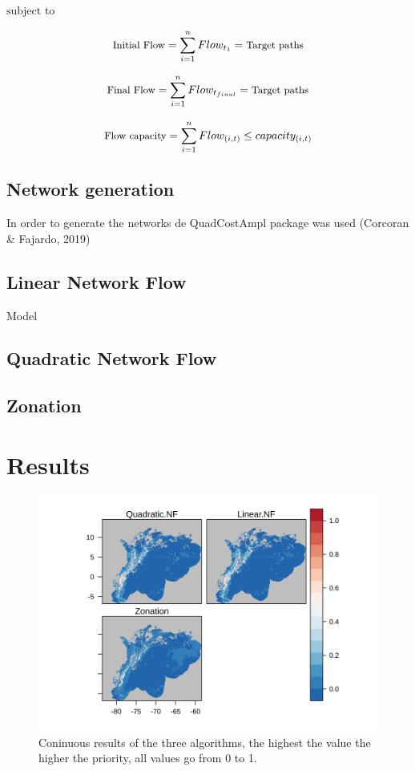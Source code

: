 \documentclass[]{article}
\begin{document}
\(\text{subject to}\)

\[\small \text{Initial Flow} = \sum_{i=1}^n{Flow_{t_1}} = \text{Target paths}\]

\[\small \text{Final Flow} = \sum_{i=1}^n{Flow_{t_{final}}} = \text{Target paths}\]

\[\small \text{Flow capacity} = \sum_{i=1}^n{Flow_{(i,t)}} \leq capacity_{(i,t)}\]

\hypertarget{network-generation}{%
\subsection{Network generation}\label{network-generation}}

In order to generate the networks de QuadCostAmpl package was used (Corcoran \& Fajardo, 2019)

\hypertarget{linear-network-flow}{%
\subsection{Linear Network Flow}\label{linear-network-flow}}

Model

\hypertarget{quadratic-network-flow}{%
\subsection{Quadratic Network Flow}\label{quadratic-network-flow}}

\hypertarget{zonation}{%
\subsection{Zonation}\label{zonation}}

\hypertarget{results}{%
\section*{Results}\label{results}}

\begin{figure}
\centering
\includegraphics{NFPaper_files/figure-latex/AllSols-1.png}
\caption{\label{fig:AllSols}Coninuous results of the three algorithms, the highest the value the higher the priority, all values go from 0 to 1.}
\end{figure}
\end{document}
